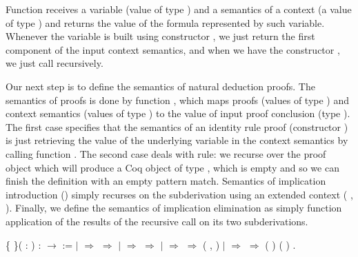 Function  receives a variable (value of type   ) and a semantics
of a context (a value of type  ) and returns the value of the formula
represented by such variable. Whenever the variable is built using constructor ,
we just return the first component of the input context semantics, and when we have
the constructor , we just call  recursively.


Our next step is to define the semantics of natural deduction proofs. The semantics of
proofs is done by function , which maps proofs (values of type   )
and context semantics (values of type  ) to the value of input proof conclusion
(type  ). The first case specifies that the semantics of an identity rule proof
(constructor ) is just retrieving the value of the underlying variable in the context semantics
by calling function . The second case deals with  rule: we recurse over the proof
object  which will produce a Coq object of type , which is empty and so we can finish the
definition with an empty pattern match. Semantics of implication introduction () simply
recurses on the subderivation  using an extended context ( , ). Finally, we define the
semantics of implication elimination as simply function application of the results of the
recursive call on its two subderivations.
\begin{coqdoccode}
\coqdocemptyline
\coqdocnoindent
{}  \{ \}( :   )\coqdoceol
\coqdocindent{1.00em}
:   \ensuremath{\rightarrow}   :=\coqdoceol
\coqdocindent{1.00em}
  \coqdoceol
\coqdocindent{1.00em}
\ensuremath{|}   \ensuremath{\Rightarrow}   \ensuremath{\Rightarrow}    \coqdoceol
\coqdocindent{1.00em}
\ensuremath{|}   \ensuremath{\Rightarrow}   \ensuremath{\Rightarrow}\coqdoceol
\coqdocindent{3.00em}
     \coqdoceol
\coqdocindent{1.00em}
\ensuremath{|}   \ensuremath{\Rightarrow}    \ensuremath{\Rightarrow}   ( , )\coqdoceol
\coqdocindent{1.00em}
\ensuremath{|}    \ensuremath{\Rightarrow}   \ensuremath{\Rightarrow}\coqdoceol
\coqdocindent{3.00em}
(  ) (  )\coqdoceol
\coqdocindent{1.00em}
.\coqdoceol
\coqdocemptyline
\end{coqdoccode}

